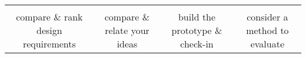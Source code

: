 {\begin{spacing}{1.0}
\begin{longtable}[]{cccc}
\begin{minipage}[t]{0.21\columnwidth}
\strut
\end{minipage} & \begin{minipage}[t]{0.21\columnwidth}\raggedright\strut
\strut
\end{minipage}\tabularnewline
\begin{minipage}[t]{0.21\columnwidth}\raggedright\strut
compare \& rank design requirements\strut
\end{minipage} & \begin{minipage}[t]{0.21\columnwidth}\raggedright\strut
compare \& relate your ideas\strut
\end{minipage} & \begin{minipage}[t]{0.21\columnwidth}\raggedright\strut
build the prototype \& check-in\strut
\end{minipage} & \begin{minipage}[t]{0.21\columnwidth}\raggedright\strut
consider a method to evaluate\strut
\end{minipage}\tabularnewline
\bottomrule
\end{longtable}
\end{spacing}
\clearpage
}
